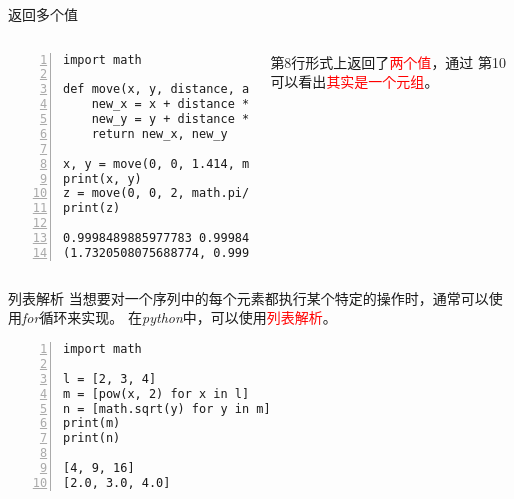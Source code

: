 \documentclass{beamer}
\begin{document}
\begin{frame}[fragile]{返回多个值}
\begin{columns}
\begin{Verbatim}[numbers=left,frame=single,rulecolor=\color{red}]
import math

def move(x, y, distance, angle = 0):
    new_x = x + distance * math.cos(angle)
    new_y = y + distance * math.sin(angle)
    return new_x, new_y
    
x, y = move(0, 0, 1.414, math.pi/4)
print(x, y)
z = move(0, 0, 2, math.pi/6)
print(z)

0.9998489885977783 0.999848988597778
(1.7320508075688774, 0.9999999999999999)
\end{Verbatim}
 
 
 
 
 
 
 
 
 
 
第8行形式上返回了\textcolor{red}{两个值}，通过
第10可以看出\textcolor{red}{其实是一个元组}。


\end{columns}
\end{frame}

\begin{frame}[fragile]{列表解析}
当想要对一个序列中的每个元素都执行某个特定的操作时，通常可以使用\textit{for}循环来实现。
在\textit{python}中，可以使用\textcolor{red}{列表解析}。
\begin{Verbatim}[numbers=left,frame=single,rulecolor=\color{red}]
import math

l = [2, 3, 4]
m = [pow(x, 2) for x in l]
n = [math.sqrt(y) for y in m]
print(m)
print(n)

[4, 9, 16]
[2.0, 3.0, 4.0]
\end{Verbatim}

\end{frame}
\end{document}
